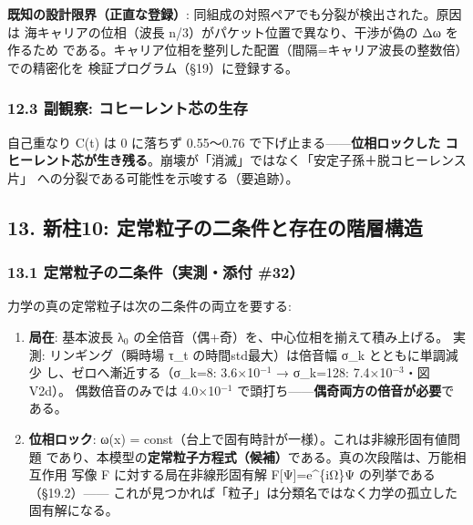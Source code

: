 \documentclass[
]{ltjarticle}
\providecommand{\tightlist}{%
  \setlength{\itemsep}{0pt}\setlength{\parskip}{0pt}}
\begin{document}
\textbf{既知の設計限界（正直な登録）}:
同組成の対照ペアでも分裂が検出された。原因は 海キャリアの位相（波長
n/3）がパケット位置で異なり、干渉が偽の Δω を作るため
である。キャリア位相を整列した配置（間隔=キャリア波長の整数倍）での精密化を
検証プログラム（§19）に登録する。

\subsubsection{12.3 副観察:
コヒーレント芯の生存}\label{ux526fux89b3ux5bdf-ux30b3ux30d2ux30fcux30ecux30f3ux30c8ux82afux306eux751fux5b58}

自己重なり C(t) は 0 に落ちず 0.55〜0.76
で下げ止まる------\textbf{位相ロックした
コヒーレント芯が生き残る}。崩壊が「消滅」ではなく「安定子孫＋脱コヒーレンス片」
への分裂である可能性を示唆する（要追跡）。

\subsection{13. 新柱10:
定常粒子の二条件と存在の階層構造}\label{ux65b0ux67f110-ux5b9aux5e38ux7c92ux5b50ux306eux4e8cux6761ux4ef6ux3068ux5b58ux5728ux306eux968eux5c64ux69cbux9020}

\subsubsection{13.1 定常粒子の二条件（実測・添付
\#32）}\label{ux5b9aux5e38ux7c92ux5b50ux306eux4e8cux6761ux4ef6ux5b9fux6e2cux6dfbux4ed8-32}

力学の真の定常粒子は次の二条件の両立を要する:

\begin{enumerate}
\def\labelenumi{\arabic{enumi}.}
\tightlist
\item
  \textbf{局在}: 基本波長 λ\(_{0}\)
  の全倍音（偶+奇）を、中心位相を揃えて積み上げる。 実測:
  リンギング（瞬時場 τ\_t の時間std最大）は倍音幅 σ\_k とともに単調減少
  し、ゼロへ漸近する（σ\_k=8: 3.6×10\(^{-1}\) → σ\_k=128:
  7.4×10\(^{-3}\)・図V2d）。 偶数倍音のみでは 4.0×10\(^{-1}\)
  で頭打ち------\textbf{偶奇両方の倍音が必要}である。
\item
  \textbf{位相ロック}: ω(x) =
  const（台上で固有時計が一様）。これは非線形固有値問題
  であり、本模型の\textbf{定常粒子方程式（候補）}である。真の次段階は、万能相互作用
  写像 F に対する局在非線形固有解 F{[}Ψ{]}=e\^{}\{iΩ\}Ψ
  の列挙である（§19.2）------
  これが見つかれば「粒子」は分類名ではなく力学の孤立した固有解になる。
\end{enumerate}
\end{document}
